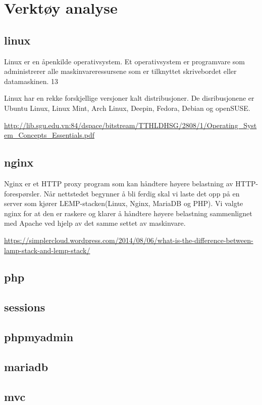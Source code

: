 \clearpage

\section{Verktøy analyse}


\subsection{linux}
Linux er en åpenkilde operativsystem. Et operativsystem er programvare som administrerer alle maskinvareressursene som er tilknyttet skrivebordet eller datamaskinen. 
13

Linux har en rekke forskjellige versjoner kalt distribusjoner. De disribusjonene er Ubuntu Linux, Linux Mint, Arch Linux, Deepin, Fedora, Debian og openSUSE.

\url{http://lib.sgu.edu.vn:84/dspace/bitstream/TTHLDHSG/2808/1/Operating_System_Concepts_Essentials.pdf}

\subsection{nginx}
Nginx er et HTTP proxy program som kan håndtere høyere belastning av HTTP-forespørsler. 
Når nettstedet begynner å bli ferdig skal vi laste det opp på en server som kjører LEMP-stacken(Linux, Nginx, MariaDB og PHP). 
Vi valgte nginx for at den er raskere og klarer å håndtere høyere belastning sammenlignet med Apache ved hjelp av det samme settet av maskinvare.

\url{https://simplercloud.wordpress.com/2014/08/06/what-is-the-difference-between-lamp-stack-and-lemp-stack/}

\subsection{php}
\subsection{sessions}
\subsection{phpmyadmin}
\subsection{mariadb}
\subsection{mvc}
